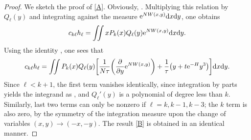 \documentclass[pdftex]{sigma}
\numberwithin{equation}{section}
\begin{document}
\begin{proof}
 We sketch the proof of \eqref{A}. Obviously, . Multiplying this relation by $Q_{\ell}(y)$ and integrating against the measure ${\rm e}^{NW(x,y)}{\rm d}x{\rm d}y$, one obtains
 \begin{equation*}
 c_{k\ell}h_{\ell} =\iint xP_k(x) Q_{\ell}(y) {\rm e}^{NW(x,y)}{\rm d}x{\rm d}y.
 \end{equation*}
 Using the identity , one sees
 that
 \begin{equation*}
 c_{k\ell}h_{\ell} = \iint P_k(x) Q_{\ell}(y)\biggl[\frac{1}{N \tau}\biggl(\frac{\partial}{\partial y} {\rm e}^{NW(x,y)}\biggr) + \frac{1}{\tau}\bigl(y + t{\rm e}^{-H}y^3\bigr)\biggr]{\rm d}x{\rm d}y.
 \end{equation*}
 Since $\ell < k+1$, the first term vanishes identically, since integration by parts yields the integrand as ,
 and $Q_{\ell}'(y)$ is a polynomial of degree less than $k$. Similarly, last two terms can only be nonzero if $\ell = k,k-1,k-3$; the $k$ term is also
 zero, by the symmetry of the integration measure upon the change of variables $(x,y) \to (-x,-y)$. The result \eqref{B} is obtained in an identical manner.
\end{proof}
\end{document}
